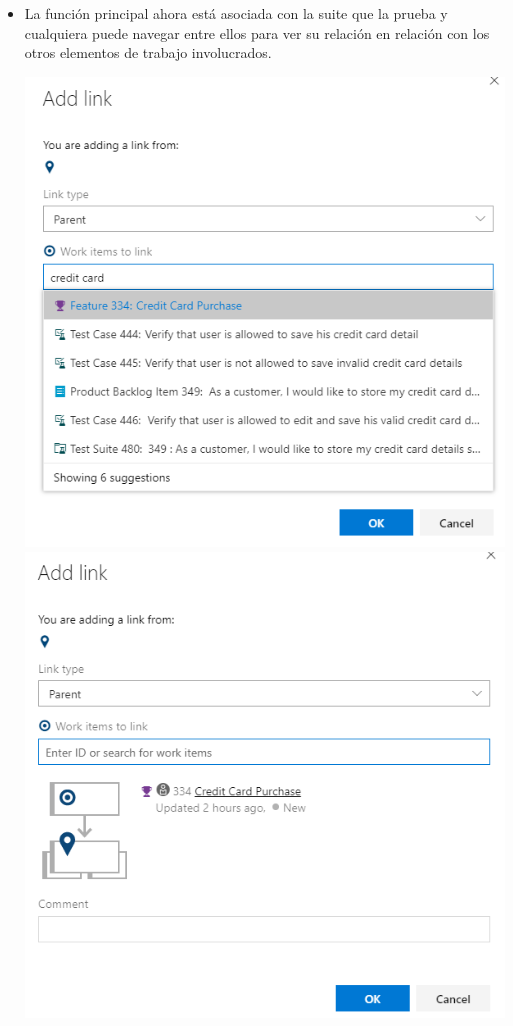 \begin{itemize}

\item La función principal ahora está asociada con la suite que la prueba y cualquiera puede navegar entre ellos para ver su relación en relación con los otros elementos de trabajo involucrados.
\begin{center}
\includegraphics[width=\columnwidth]{images/4}\newline
\includegraphics[width=\columnwidth]{images/6}\newline

\end{center}
\end{itemize}
